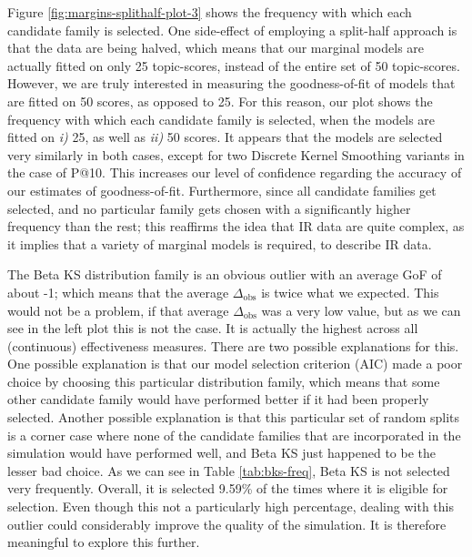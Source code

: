 Figure \ref{fig:margins-splithalf-plot-3} shows the frequency with which each candidate family is selected. One side-effect of employing a split-half approach is that the data are being halved, which means that our marginal models are actually fitted on only 25 topic-scores, instead of the entire set of 50 topic-scores. However, we are truly interested in measuring the goodness-of-fit of models that are fitted on 50 scores, as opposed to 25. For this reason, our plot shows the frequency with which each candidate family is selected, when the models are fitted on \textit{i)} 25, as well as \textit{ii)} 50 scores. It appears that the models are selected very similarly in both cases, except for two Discrete Kernel Smoothing variants in the case of P@10. This increases our level of confidence regarding the accuracy of our estimates of goodness-of-fit. Furthermore, since all candidate families get selected, and no particular family gets chosen with a significantly higher frequency than the rest; this reaffirms the idea that IR data are quite complex, as it implies that a variety of marginal models is required, to describe IR data. 

The Beta KS distribution family is an obvious outlier with an average GoF of about -1; which means that the average $\Delta_{\text{obs}}$ is twice what we expected. This would not be a problem, if that average $\Delta_{\text{obs}}$ was a very low value, but as we can see in the left plot this is not the case. It is actually the highest across all (continuous) effectiveness measures. There are two possible explanations for this. One possible explanation is that our model selection criterion (AIC) made a poor choice by choosing this particular distribution family, which means that some other candidate family would have performed better if it had been properly selected. Another possible explanation is that this particular set of random splits is a corner case where none of the candidate families that are incorporated in the simulation would have performed well, and Beta KS just happened to be the lesser bad choice. As we can see in Table \ref{tab:bks-freq}, Beta KS is not selected very frequently. Overall, it is selected 9.59\% of the times where it is eligible for selection. Even though this not a particularly high percentage, dealing with this outlier could considerably improve the quality of the simulation. It is therefore meaningful to explore this further.



